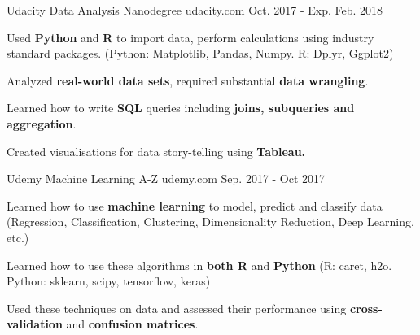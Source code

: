


\begin{cventries}
    \cventry
      {Udacity} %
      {Data Analysis Nanodegree} %
      {udacity.com} %
      {Oct. 2017 - Exp. Feb. 2018} %
      {
        \begin{cvitems} %
          \item {Used \textbf{Python} and \textbf{R} to import data, perform calculations using industry standard packages. (Python: Matplotlib, Pandas, Numpy. R: Dplyr, Ggplot2)}
          \item {Analyzed \textbf{real-world data sets}, required substantial \textbf{data wrangling}.}
          \item {Learned how to write \textbf{SQL} queries including \textbf{joins, subqueries and aggregation}.}
          \item {Created visualisations for data story-telling using \textbf{Tableau.}}
        \end{cvitems}
      }

      \cventry
      {Udemy}
      {Machine Learning A-Z} %
      {udemy.com} %
      {Sep. 2017 - Oct 2017} %
      {
        \begin{cvitems} %
          \item {Learned how to use \textbf{machine learning} to model, predict and classify data (Regression, Classification, Clustering, Dimensionality Reduction, Deep Learning, etc.)}
          \item {Learned how to use these algorithms in \textbf{both R} and \textbf{Python} (R: caret, h2o. Python: sklearn, scipy, tensorflow, keras)}
          \item {Used these techniques on data and assessed their performance using \textbf{cross-validation} and \textbf{confusion matrices}.}
        \end{cvitems}
      }


\end{cventries}
